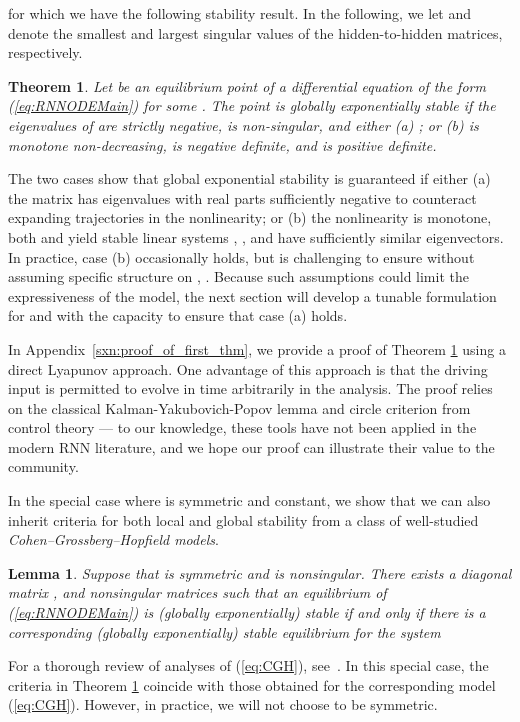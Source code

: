 \documentclass{article} \usepackage{iclr2021_conference,times}
\newtheorem{theorem}{Theorem}
\newtheorem{lemma}{Lemma}
\begin{document}
for which we have the following stability result. In the following, we let  and  denote the smallest and largest singular values of the hidden-to-hidden matrices, respectively.

\begin{theorem}
\label{thm:StabilityMain}
Let  be an equilibrium point of a differential equation of the form (\ref{eq:RNNODEMain}) for some . The point  is globally exponentially stable if the eigenvalues of  are strictly negative,  is non-singular, and either (a) ; or (b)   is monotone non-decreasing,  is negative definite, and  is positive definite.
\end{theorem}
The two cases show that global exponential stability is guaranteed if either (a) the matrix  has eigenvalues with real parts sufficiently negative to counteract expanding trajectories in the nonlinearity; or (b) the nonlinearity is monotone, both  and  yield stable linear systems , , and  have sufficiently similar eigenvectors. In practice, case (b) occasionally holds, but is challenging to ensure without assuming specific structure on , . Because such assumptions could limit the expressiveness of the model, the next section will develop a tunable formulation for  and  with the capacity to ensure that case (a) holds. 

In Appendix~\ref{sxn:proof_of_first_thm}, we provide a proof of Theorem \ref{thm:StabilityMain} using a direct Lyapunov approach. One advantage of this approach is that the driving input  is permitted to evolve in time arbitrarily in the analysis. The proof relies on the classical Kalman-Yakubovich-Popov lemma and circle criterion from control theory --- to our knowledge, these tools have not been applied in the modern RNN literature, and we hope our proof can illustrate their value to the community.

In the special case where  is symmetric and  constant, we show that we can also inherit criteria for both local and global stability from a class of well-studied \emph{Cohen--Grossberg--Hopfield models}.
\begin{lemma}
\label{lem:CGH}
Suppose that  is symmetric and  is nonsingular. There exists a diagonal matrix , and nonsingular matrices  such that an equilibrium of (\ref{eq:RNNODEMain}) is (globally exponentially) stable if and only if there is a corresponding (globally exponentially) stable equilibrium for the system

\end{lemma}
For a thorough review of analyses of (\ref{eq:CGH}), see~\citep{zhang2014comprehensive}. In this special case, the criteria in Theorem \ref{thm:StabilityMain} coincide with those obtained for the corresponding model (\ref{eq:CGH}). However, in practice, we will not choose  to be symmetric.
\end{document}
